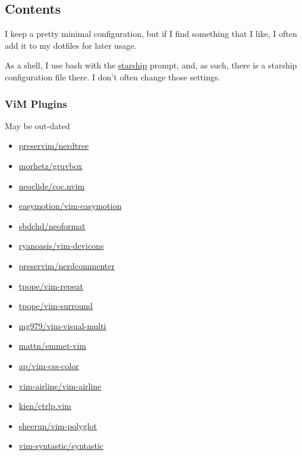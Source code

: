 \hypertarget{contents}{%
\subsection{Contents}\label{contents}}

I keep a pretty minimal configuration, but if I find something that I
like, I often add it to my dotfiles for later usage.

As a shell, I use bash with the \href{https://starship.rs}{starship}
prompt, and, as such, there is a starship configuration file there. I
don't often change those settings.

\hypertarget{vim-plugins}{%
\subsubsection{ViM Plugins}\label{vim-plugins}}

May be out-dated

\begin{itemize}
\tightlist
\item
  \href{https://preservim/nerdtree}{preservim/nerdtree}
\item
  \href{https://github.com/morhetz/gruvbox}{morhetz/gruvbox}
\item
  \href{https://github.com/neoclide/coc.nvim}{neoclide/coc.nvim}
\item
  \href{https://github.com/easymotion/vim-easymotion}{easymotion/vim-easymotion}
\item
  \href{https://github.com/sbdchd/neoformat}{sbdchd/neoformat}
\item
  \href{https://github.com/ryanoasis/vim-devicons}{ryanoasis/vim-devicons}
\item
  \href{https://github.com/preservim/nerdcommenter}{preservim/nerdcommenter}
\item
  \href{https://github.com/tpope/vim-repeat}{tpope/vim-repeat}
\item
  \href{https://github.com/tpope/vim-surround}{tpope/vim-surround}
\item
  \href{https://github.com/mg979/vim-visual-multi}{mg979/vim-visual-multi}
\item
  \href{https://github.com/mattn/emmet-vim}{mattn/emmet-vim}
\item
  \href{https://github.com/ap/vim-css-color}{ap/vim-css-color}
\item
  \href{https://github.com/vim-airline/vim-airline}{vim-airline/vim-airline}
\item
  \href{https://github.com/kien/ctrlp.vim}{kien/ctrlp.vim}
\item
  \href{https://github.com/sheerun/vim-polyglot}{sheerun/vim-polyglot}
\item
  \href{https://github.com/vim-syntastic/syntastic}{vim-syntastic/syntastic}
\end{itemize}
